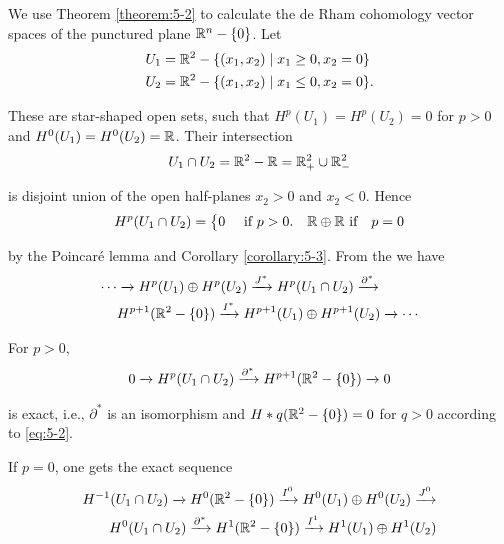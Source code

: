 \begin{example}\label{example:5-4}
  We use Theorem \ref{theorem:5-2} to calculate the de Rham cohomology vector spaces of the punctured plane $\mathbb{R}^n-\{0\}$. Let 
  \begin{align*}
    U_{1} & = \mathbb{R}^2-\{(x_1,x_2)\mid x_1\geq0, x_2=0\}\\
    U_{2} & = \mathbb{R}^2-\{(x_1,x_2)\mid x_1\leq0, x_2=0\}.
  \end{align*}

  These are star-shaped open sets, such that $H^p(U_1) = H^p(U_2) = 0$ for $p>0$ and $H^0(U_1) = H^0(U_2) = \mathbb{R}$. 
  Their intersection 
  \begin{align*}
    U_1\cap U_2 = \mathbb{R}^2-\mathbb{R} = \mathbb{R}^2_+\cup \mathbb{R}^2_-
  \end{align*}

  is disjoint union of the open half-planes $x_2>0$ and $x_2<0$. Hence 
  \begin{align}\label{eq:5-2}
    H^p(U_1\cap U_2) = \left\{\begin{aligned}
      & 0 && \text{ if } p>0.
      & \mathbb{R}\oplus\mathbb{R} \text{ if} && p = 0
    \end{aligned}\right.
  \end{align}

  by the Poincar\'e lemma and Corollary \ref{corollary:5-3}. From the  we have
  \begin{align*}
    \cdots  & \xrightarrow[]{} H^p(U_1)\oplus H^p(U_2)\xrightarrow[]{J^*}H^p(U_1\cap U_2)\xrightarrow[]{\partial^*}\\
            & H^{p+1}(\mathbb{R}^2-\{0\})\xrightarrow[]{I^*} H^{p+1}(U_1)\oplus H^{p+1}(U_2)\xrightarrow[]{}\cdots
  \end{align*}
\end{example}

For $p>0$, 
\begin{align*}
  0\xrightarrow[]{} H^p(U_1\cap U_2)\xrightarrow[]{\partial^*} H^{p+1}(\mathbb{R}^2-\{0\})\xrightarrow[]{} 0
\end{align*}

is exact, i.e., $\partial^*$ is an isomorphism and $H*q(\mathbb{R}^2-\{0\}) = 0$ for $q>0$ according 
to \eqref{eq:5-2}.

If $p=0$, one gets the exact sequence
\begin{align}\label{eq:5-3}
\begin{aligned}
  H^{-1}(U_1\cap U_2)\xrightarrow[]{} H^0(\mathbb{R}^2-\{0\}) \xrightarrow[]{I^0} H^0(U_1)\oplus H^0(U_2)\xrightarrow[]{J^0} \\
  H^0(U_1\cap U_2)\xrightarrow[]{\partial^*} H^1(\mathbb{R}^2-\{0\}) \xrightarrow[]{I^1}H^1(U_1)\oplus H^1(U_2)
\end{aligned}
\end{align}

